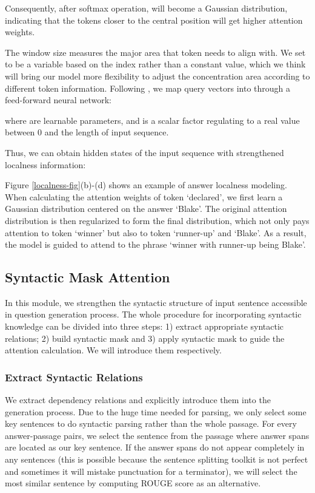 \documentclass[11pt]{article}
\begin{document}
Consequently, after softmax operation,  will become a Gaussian distribution, indicating that the tokens closer to the central position will get higher attention weights.


The window size  measures the major area that token  needs to align with. We set  to be a variable based on the index  rather than a constant value, which we think will bring our model more flexibility to adjust the concentration area according to different token information. Following \citet{yang-etal-2018-modeling}, we map query vectors into  through a feed-forward neural network:

where  are learnable parameters, and  is a scalar factor regulating  to a real value between 0 and the length of input sequence.

Thus, we can obtain hidden states of the input sequence with strengthened localness information:


Figure \ref{localness-fig}(b)-(d) shows an example of answer localness modeling. When calculating the attention weights of token `declared', we first learn a Gaussian distribution centered on the answer `Blake'. The original attention distribution is then regularized to form the final distribution, which not only pays attention to token `winner' but also to token `runner-up' and `Blake'. As a result, the model is guided to attend to the phrase `winner with runner-up being Blake'. 

\subsection{Syntactic Mask Attention}
In this module, we strengthen the syntactic structure of input sentence accessible in question generation process.
The whole procedure for incorporating syntactic knowledge can be divided into three steps: 1) extract appropriate syntactic relations; 2) build syntactic mask and 3) apply syntactic mask to guide the attention calculation. We will introduce them respectively.


\subsubsection{Extract Syntactic Relations} \label{section-extract-relation}
We extract dependency relations and explicitly introduce them into the generation process. Due to the huge time needed for parsing, we only select some key sentences to do syntactic parsing rather than the whole passage. For every answer-passage pairs, we select the sentence from the passage where answer spans are located as our key sentence. If the answer spans do not appear completely in any sentences (this is possible because the sentence splitting toolkit is not perfect and sometimes it will mistake punctuation for a terminator), we will select the most similar sentence by computing ROUGE score as an alternative.
\end{document}
